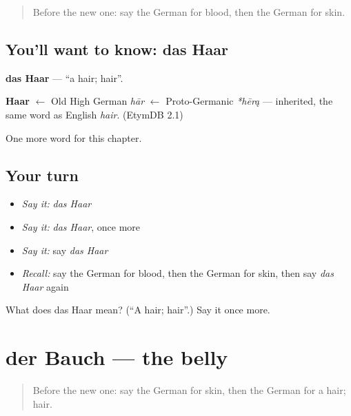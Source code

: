 \label{lesson:GE-C57-haar}



\begin{quote}
Before the new one: say the German for blood, then the German for skin.
\end{quote}

\subsection*{You'll want to know: das Haar}
\textbf{das Haar} — \textquotedblleft{}a hair; hair\textquotedblright{}.

\begin{cousinweb}
\textbf{Haar} $\leftarrow$ Old High German \emph{hār} $\leftarrow$ Proto-Germanic \emph{*hērą} — inherited, the same word as English \emph{hair}. (EtymDB 2.1)
\end{cousinweb}

\begin{grammarlens}[title={What you've built}]
One more word for this chapter.
\end{grammarlens}

\subsection*{Your turn}
\begin{itemize}
\raggedright
  \item \emph{Say it:} \emph{das Haar}
  \item \emph{Say it:} \emph{das Haar}, once more
  \item \emph{Say it:} say \emph{das Haar}
  \item \emph{Recall:} say the German for blood, then the German for skin, then say \emph{das Haar} again
\end{itemize}

\begin{tcolorbox}[breakable,colback=teal!4,colframe=teal!35!black,title={Before you move on}]
What does das Haar mean? (\textquotedblleft{}A hair; hair\textquotedblright{}.) Say it once more.
\end{tcolorbox}
\section[der Bauch]{der Bauch — the belly}

\label{lesson:GE-C57-bauch}



\begin{quote}
Before the new one: say the German for skin, then the German for a hair; hair.
\end{quote}


